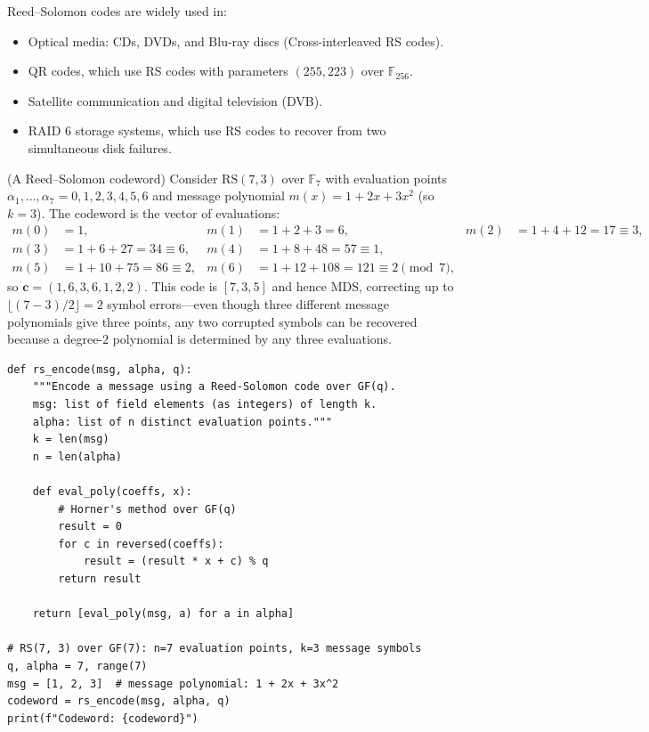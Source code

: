 \documentclass[a4paper, 12pt]{book} %
\begin{document}
\begin{remark}
    Reed--Solomon codes are widely used in:
    \begin{itemize}
        \item Optical media: CDs, DVDs, and Blu-ray discs (Cross-interleaved RS codes).
        \item QR codes, which use RS codes with parameters $(255, 223)$ over $\mathbb{F}_{256}$.
        \item Satellite communication and digital television (DVB).
        \item RAID 6 storage systems, which use RS codes to recover from two simultaneous disk failures.
    \end{itemize}
\end{remark}

\begin{example}
    (A Reed--Solomon codeword) Consider $\mathrm{RS}(7, 3)$ over $\mathbb{F}_7$ with evaluation points $\alpha_1,\ldots,\alpha_7 = 0,1,2,3,4,5,6$ and message polynomial $m(x) = 1 + 2x + 3x^2$ (so $k = 3$). The codeword is the vector of evaluations:
    \begin{align}
        m(0) &= 1, & m(1) &= 1 + 2 + 3 = 6, & m(2) &= 1 + 4 + 12 = 17 \equiv 3, \\
        m(3) &= 1 + 6 + 27 = 34 \equiv 6, & m(4) &= 1 + 8 + 48 = 57 \equiv 1, \\
        m(5) &= 1 + 10 + 75 = 86 \equiv 2, & m(6) &= 1 + 12 + 108 = 121 \equiv 2 \pmod 7,
    \end{align}
    so $\mathbf{c} = (1, 6, 3, 6, 1, 2, 2)$. This code is $[7, 3, 5]$ and hence MDS, correcting up to $\lfloor(7-3)/2\rfloor = 2$ symbol errors---even though three different message polynomials give three points, any two corrupted symbols can be recovered because a degree-$2$ polynomial is determined by any three evaluations.
\end{example}

\begin{verbatim}
def rs_encode(msg, alpha, q):
    """Encode a message using a Reed-Solomon code over GF(q).
    msg: list of field elements (as integers) of length k.
    alpha: list of n distinct evaluation points."""
    k = len(msg)
    n = len(alpha)

    def eval_poly(coeffs, x):
        # Horner's method over GF(q)
        result = 0
        for c in reversed(coeffs):
            result = (result * x + c) % q
        return result

    return [eval_poly(msg, a) for a in alpha]

# RS(7, 3) over GF(7): n=7 evaluation points, k=3 message symbols
q, alpha = 7, range(7)
msg = [1, 2, 3]  # message polynomial: 1 + 2x + 3x^2
codeword = rs_encode(msg, alpha, q)
print(f"Codeword: {codeword}")
\end{verbatim}
\end{document}
